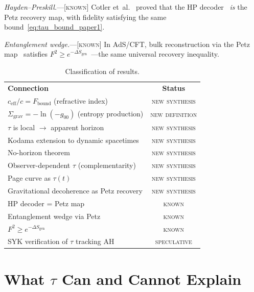 \documentclass[prl,twocolumn,superscriptaddress,longbibliography,floatfix]{revtex4-2}
\newcommand{\tauasym}{\tau}
\newcommand{\ceff}{c_{\mathrm{eff}}}
\newcommand{\Sgrav}{\Sigma_{\mathrm{grav}}}
\newcommand{\Fbound}{F_{\mathrm{bound}}}
\begin{document}
\emph{Hayden--Preskill.}---[\textsc{known}]
Cotler et~al.~\cite{Cotler2019} proved that the HP
decoder~\cite{HaydenPreskill2007} \emph{is} the Petz
recovery map, with fidelity satisfying the same
bound~\eqref{eq:tau_bound_paper1}.

\emph{Entanglement wedge.}---[\textsc{known}]
In AdS/CFT, bulk reconstruction via the Petz
map~\cite{ADH2015,CPS2020} satisfies
$F^2 \geq e^{-\Delta S_{\text{gen}}}$~\cite{Cotler2019}---the
same universal recovery inequality.

\begin{table}[t]
\caption{\label{tab:classification}Classification of results.}
\begin{ruledtabular}
\begin{tabular}{lc}
  \textbf{Connection} & \textbf{Status} \\
  \colrule
  $\ceff/c = \Fbound$ (refractive index)
    & \textsc{new synthesis} \\
  $\Sgrav = -\ln(-g_{00})$ (entropy production)
    & \textsc{new definition} \\
  $\tauasym$ is local $\to$ apparent horizon
    & \textsc{new synthesis} \\
  Kodama extension to dynamic spacetimes
    & \textsc{new synthesis} \\
  No-horizon theorem
    & \textsc{new synthesis} \\
  Observer-dependent $\tauasym$ (complementarity)
    & \textsc{new synthesis} \\
  Page curve as $\tauasym(t)$
    & \textsc{new synthesis} \\
  Gravitational decoherence as Petz recovery
    & \textsc{new synthesis} \\
  HP decoder = Petz map~\cite{Cotler2019}
    & \textsc{known} \\
  Entanglement wedge via Petz~\cite{CPS2020}
    & \textsc{known} \\
  $F^2 \geq e^{-\Delta S_{\mathrm{gen}}}$~\cite{Penington2020}
    & \textsc{known} \\
  SYK verification of $\tauasym$ tracking AH
    & \textsc{speculative} \\
\end{tabular}
\end{ruledtabular}
\end{table}

\section{What $\tauasym$ Can and Cannot Explain}
\label{sec:scope}
\end{document}
